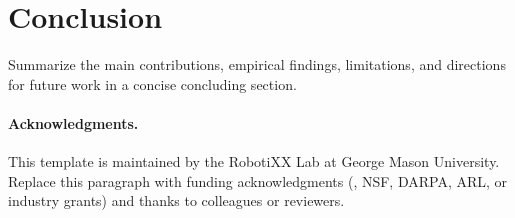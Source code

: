 \section{Conclusion}
\label{sec:conclusion}

Summarize the main contributions, empirical findings, limitations, and directions for future work in a concise concluding section.

\paragraph{Acknowledgments.}
This template is maintained by the RobotiXX Lab at George Mason University. Replace this paragraph with funding acknowledgments (\eg, NSF, DARPA, ARL, or industry grants) and thanks to colleagues or reviewers.
